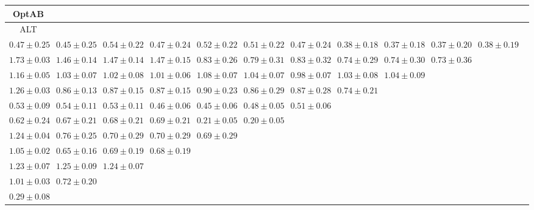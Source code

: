 \begin{table}[ht]
{{\begin{adjustbox}{width=\textwidth}
\begin{tabular}{cccccccccccc}
\hline
OptAB &  &  &  &  &  &  &  &  &  & \\
\hline
ALT &  &  &  &  &  &  &  &  &  & \\
\hline
$0.47 \pm 0.25$ & $0.45 \pm 0.25$ & $0.54 \pm 0.22$ & $0.47 \pm 0.24$ & $0.52 \pm 0.22$ & $0.51 \pm 0.22$ & $0.47 \pm 0.24$ & $0.38 \pm 0.18$ & $0.37 \pm 0.18$ & $0.37 \pm 0.20$ & $0.38 \pm 0.19$ &  \\
$1.73 \pm 0.03$ & $1.46 \pm 0.14$ & $1.47 \pm 0.14$ & $1.47 \pm 0.15$ & $0.83 \pm 0.26$ & $0.79 \pm 0.31$ & $0.83 \pm 0.32$ & $0.74 \pm 0.29$ & $0.74 \pm 0.30$ & $0.73 \pm 0.36$ &  &  \\
$1.16 \pm 0.05$ & $1.03 \pm 0.07$ & $1.02 \pm 0.08$ & $1.01 \pm 0.06$ & $1.08 \pm 0.07$ & $1.04 \pm 0.07$ & $0.98 \pm 0.07$ & $1.03 \pm 0.08$ & $1.04 \pm 0.09$ &  &  &  \\
$1.26 \pm 0.03$ & $0.86 \pm 0.13$ & $0.87 \pm 0.15$ & $0.87 \pm 0.15$ & $0.90 \pm 0.23$ & $0.86 \pm 0.29$ & $0.87 \pm 0.28$ & $0.74 \pm 0.21$ &  &  &  &  \\
$0.53 \pm 0.09$ & $0.54 \pm 0.11$ & $0.53 \pm 0.11$ & $0.46 \pm 0.06$ & $0.45 \pm 0.06$ & $0.48 \pm 0.05$ & $0.51 \pm 0.06$ &  &  &  &  &  \\
$0.62 \pm 0.24$ & $0.67 \pm 0.21$ & $0.68 \pm 0.21$ & $0.69 \pm 0.21$ & $0.21 \pm 0.05$ & $0.20 \pm 0.05$ &  &  &  &  &  &  \\
$1.24 \pm 0.04$ & $0.76 \pm 0.25$ & $0.70 \pm 0.29$ & $0.70 \pm 0.29$ & $0.69 \pm 0.29$ &  &  &  &  &  &  &  \\
$1.05 \pm 0.02$ & $0.65 \pm 0.16$ & $0.69 \pm 0.19$ & $0.68 \pm 0.19$ &  &  &  &  &  &  &  &  \\
$1.23 \pm 0.07$ & $1.25 \pm 0.09$ & $1.24 \pm 0.07$ &  &  &  &  &  &  &  &  &  \\
$1.01 \pm 0.03$ & $0.72 \pm 0.20$ &  &  &  &  &  &  &  &  &  &  \\
$0.29 \pm 0.08$ &  &  &  &  &  &  &  &  &  &  &  \\



\end{tabular}
\end{adjustbox}}}
\end{table}
